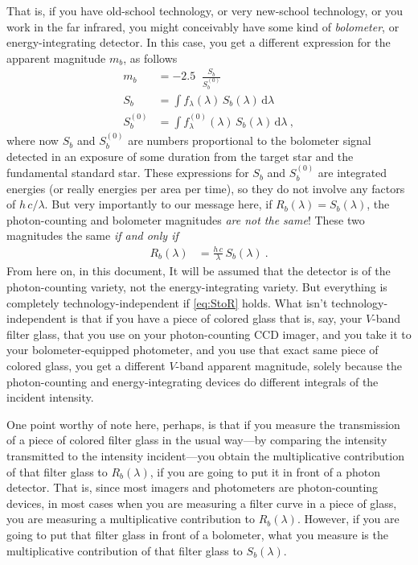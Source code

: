 \documentclass[10pt]{article}
\newcommand{\dd}{\mathrm{d}}
\DeclareMathOperator{\logten}{log_{10}}
\begin{document}
That is, if you have old-school technology, or very new-school technology, or you work in the far infrared, you might conceivably have some kind of \emph{bolometer}, or energy-integrating detector.
In this case, you get a different expression for the apparent magnitude $m_b$, as follows
\begin{align}
    m_b &= -2.5\logten\frac{S_b}{S^{(0)}_b}\\
    S_b &= \int f_\lambda(\lambda)\,S_b(\lambda)\,\dd\lambda\\
    S^{(0)}_b &= \int f^{(0)}_\lambda(\lambda)\,S_b(\lambda)\,\dd\lambda~,
\end{align}
where now $S_b$ and $S^{(0)}_b$ are numbers proportional to the bolometer signal detected in an exposure of some duration from the target star and the fundamental standard star.
These expressions for $S_b$ and $S^{(0)}_b$ are integrated energies (or really energies per area per time), so they do not involve any factors of $h\,c/\lambda$.
But very importantly to our message here, if $R_b(\lambda)=S_b(\lambda)$, the photon-counting and bolometer magnitudes \emph{are not the same}!
These two magnitudes the same \emph{if and only if}
\begin{align}
    R_b(\lambda) &= \frac{h\,c}{\lambda}\,S_b(\lambda)~.\label{eq:StoR}
\end{align}
From here on, in this document, It will be assumed that the detector is of the photon-counting variety, not the energy-integrating variety.
But everything is completely technology-independent if \eqref{eq:StoR} holds.
What isn't technology-independent is that if you have a piece of colored glass that is, say, your $V$-band filter glass, that you use on your photon-counting CCD imager, and you take it to your bolometer-equipped photometer, and you use that exact same piece of colored glass, you get a different $V$-band apparent magnitude, solely because the photon-counting and energy-integrating devices do different integrals of the incident intensity.

One point worthy of note here, perhaps, is that if you measure the transmission of a piece of colored filter glass in the usual way---by comparing the intensity transmitted to the intensity incident---you obtain the multiplicative contribution of that filter glass to $R_b(\lambda)$, if you are going to put it in front of a photon detector.
That is, since most imagers and photometers are photon-counting devices, in most cases when you are measuring a filter curve in a piece of glass, you are measuring a multiplicative contribution to $R_b(\lambda)$.
However, if you are going to put that filter glass in front of a bolometer, what you measure is the multiplicative contribution of that filter glass to $S_b(\lambda)$.
\end{document}
